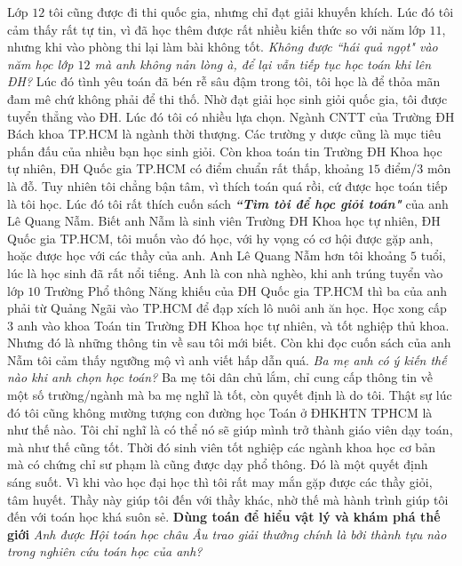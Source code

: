 \begin{multicols}{2}
	\vskip 0.1cm
	Lớp $12$ tôi cũng được đi thi quốc gia, nhưng chỉ đạt giải khuyến khích. Lúc đó tôi cảm thấy rất tự tin, vì đã học thêm được rất nhiều kiến thức so với năm lớp $11$, nhưng khi vào phòng thi lại làm bài không tốt.  
	\vskip 0.1cm
	\textit{Không được ``hái quả ngọt" vào năm học lớp $12$ mà anh không nản lòng à, để lại vẫn tiếp tục học toán khi lên ĐH?}   
	\vskip 0.1cm
	Lúc đó tình yêu toán đã bén rễ sâu đậm trong tôi, tôi học là để thỏa mãn đam mê chứ không phải để thi thố. 
	\vskip 0.1cm
	Nhờ đạt giải học sinh giỏi quốc gia, tôi được tuyển thẳng vào ĐH. Lúc đó tôi có nhiều lựa chọn. Ngành CNTT của Trường ĐH Bách khoa TP.HCM là ngành thời thượng. Các trường y dược cũng là mục tiêu phấn đấu của nhiều bạn học sinh giỏi. Còn khoa toán tin Trường ĐH Khoa học tự nhiên, ĐH Quốc gia TP.HCM có điểm chuẩn rất thấp, khoảng $15$ điểm/$3$ môn là đỗ. Tuy nhiên tôi chẳng bận tâm, vì thích toán quá rồi, cứ được học toán tiếp là tôi học. 
	\vskip 0.1cm
	Lúc đó tôi rất thích cuốn sách \textbf{\color{diendantoanhoc}\textit{``Tìm tòi để học giỏi toán"}} của anh Lê Quang Nẫm. Biết anh Nẫm là sinh viên Trường ĐH Khoa học tự nhiên, ĐH Quốc gia TP.HCM, tôi muốn vào đó học, với hy vọng có cơ hội được gặp anh, hoặc được học với các thầy của anh. 
	\vskip 0.1cm
	Anh Lê Quang Nẫm hơn tôi khoảng $5$ tuổi, lúc là học sinh đã rất nổi tiếng. Anh là con nhà nghèo, khi anh trúng tuyển vào lớp $10$ Trường Phổ thông Năng khiếu của ĐH Quốc gia TP.HCM thì ba của anh phải từ Quảng Ngãi vào TP.HCM để đạp xích lô nuôi anh ăn học. Học xong cấp $3$ anh vào khoa Toán tin Trường ĐH Khoa học tự nhiên, và tốt nghiệp thủ khoa. Nhưng đó là những thông tin về sau tôi mới biết. Còn khi đọc cuốn sách của anh Nẫm tôi cảm thấy ngưỡng mộ vì anh viết hấp dẫn quá. 
	\vskip 0.1cm
	\textit{Ba mẹ anh có ý kiến thế nào khi anh chọn học toán?}
	\vskip 0.1cm 
	Ba mẹ tôi dân chủ lắm, chỉ cung cấp thông tin về một số trường/ngành mà ba mẹ nghĩ là tốt, còn quyết định là do tôi. Thật sự lúc đó tôi cũng không mường tượng con đường học Toán ở ĐHKHTN TPHCM là như thế nào. Tôi chỉ nghĩ là có thể nó sẽ giúp mình trở thành giáo viên dạy toán, mà như thế cũng tốt. Thời đó sinh viên tốt nghiệp các ngành khoa học cơ bản mà có chứng chỉ sư phạm là cũng được dạy phổ thông. 
	\vskip 0.1cm
	Đó là một quyết định sáng suốt. Vì khi vào học đại học thì tôi rất may mắn gặp được các thầy giỏi, tâm huyết. Thầy này giúp tôi đến với thầy khác, nhờ thế mà hành trình giúp tôi đến với toán học khá suôn sẻ. 
	\vskip 0.1cm
	\textbf{\color{diendantoanhoc}Dùng toán để hiểu vật lý và khám phá thế giới}
	\vskip 0.1cm 
	\textit{Anh được Hội toán học châu Âu trao giải thưởng chính là bởi thành tựu nào trong nghiên cứu toán học của anh?}

\end{multicols}
